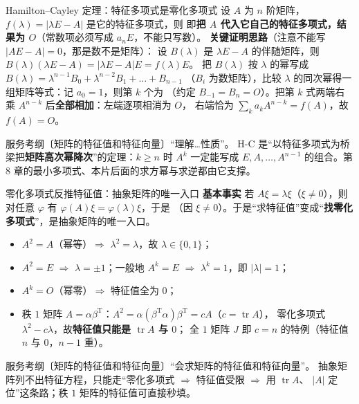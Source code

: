 \begin{fdeep}{Hamilton--Cayley 定理：特征多项式是零化多项式}
 设 $A$ 为 $n$ 阶矩阵，$f(\lambda)=\lvert\lambda E-A\rvert$ 是它的特征多项式，则
即\textbf{把 $A$ 代入它自己的特征多项式，结果为 $O$}（常数项必须写成 $a_nE$，不能只写数）。
\textbf{关键证明思路}（注意不能写 $\lvert AE-A\rvert=0$，那是数不是矩阵）：
设 $B(\lambda)$ 是 $\lambda E-A$ 的伴随矩阵，则 $B(\lambda)(\lambda E-A)=\lvert\lambda E-A\rvert E=f(\lambda)E$。
把 $B(\lambda)$ 按 $\lambda$ 的幂写成 $B(\lambda)=\lambda^{n-1}B_0+\lambda^{n-2}B_1+\dots+B_{n-1}$
（$B_i$ 为数矩阵），比较 $\lambda$ 的同次幂得一组矩阵等式：记 $a_0=1$，则第 $k$ 个为
（约定 $B_{-1}=B_n=O$）。把第 $k$ 式两端右乘 $A^{n-k}$ 后\textbf{全部相加}：左端逐项相消为 $O$，
右端恰为 $\sum_ka_kA^{n-k}=f(A)$，故 $f(A)=O$。

\fbref{}服务考纲〔矩阵的特征值和特征向量〕“理解…性质”。
H-C 是“以特征多项式为桥梁把\textbf{矩阵高次幂降次}”的定理：$k\ge n$ 时 $A^{k}$ 一定能写成
$E,A,\dots,A^{n-1}$ 的组合。第 8 章的最小多项式、本片后面的求方幂与求逆都由它支撑。
\end{fdeep}

\begin{fdeep}{零化多项式反推特征值：抽象矩阵的唯一入口}
\textbf{基本事实} 若 $A\xi=\lambda\xi$（$\xi\ne0$），则对任意 $\varphi$ 有
$\varphi(A)\xi=\varphi(\lambda)\xi$，于是
（因 $\xi\ne0$）。于是“求特征值”变成“\textbf{找零化多项式}”，是抽象矩阵的唯一入口。
\begin{itemize}[leftmargin=2.2em,itemsep=0.22em]
\item $A^{2}=A$（幂等）$\Rightarrow$ $\lambda^{2}=\lambda$，故 $\lambda\in\{0,1\}$；
\item $A^{2}=E$ $\Rightarrow$ $\lambda=\pm1$；一般地 $A^{k}=E$ $\Rightarrow$ $\lambda^{k}=1$，即 $|\lambda|=1$；
\item $A^{k}=O$（幂零）$\Rightarrow$ 特征值全为 $0$；
\item 秩 $1$ 矩阵 $A=\alpha\beta^{\mathrm T}$：$A^{2}=\alpha(\beta^{\mathrm T}\alpha)\beta^{\mathrm T}=cA$（$c=\operatorname{tr}A$），
零化多项式 $\lambda^{2}-c\lambda$，故\textbf{特征值只能是 $\operatorname{tr}A$ 与 $0$}；
全 $1$ 矩阵 $J$ 即 $c=n$ 的特例（特征值 $n$ 与 $0$，$n-1$ 重）。
\end{itemize}

\fbref{}服务考纲〔矩阵的特征值和特征向量〕“会求矩阵的特征值和特征向量”。
抽象矩阵列不出特征方程，只能走“零化多项式 $\Rightarrow$ 特征值受限 $\Rightarrow$ 用 $\operatorname{tr}A$、
$\lvert A\rvert$ 定位”这条路；秩 $1$ 矩阵的特征值可直接秒填。
\end{fdeep}

